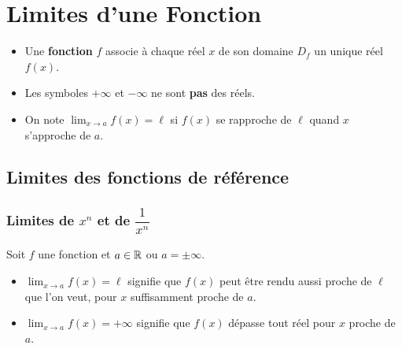 
\chapter{Limites d'une Fonction}

\begin{rappel}
  \begin{itemize}[leftmargin=1.2cm]
    \item Une \textbf{fonction} $f$ associe \`{a} chaque r\'{e}el $x$ de son domaine $D_f$
          un unique r\'{e}el $f(x)$.
    \item Les symboles $+\infty$ et $-\infty$ ne sont \textbf{pas} des r\'{e}els.
    \item On note $\displaystyle\lim_{x \to a} f(x) = \ell$ si $f(x)$
          se rapproche de $\ell$ quand $x$ s'approche de $a$.
  \end{itemize}
\end{rappel}

\section{Limites des fonctions de r\'{e}f\'{e}rence}

\subsection{Limites de \texorpdfstring{$x^n$}{x\^n} et de \texorpdfstring{$\dfrac{1}{x^n}$}{1/x\^n}}

\begin{definition}
  Soit $f$ une fonction et $a \in \mathbb{R}$ ou $a = \pm\infty$.
  \begin{itemize}
    \item $\displaystyle\lim_{x \to a} f(x) = \ell$ signifie que $f(x)$
          peut \^{e}tre rendu aussi proche de $\ell$ que l'on veut,
          pour $x$ suffisamment proche de $a$.
    \item $\displaystyle\lim_{x \to a} f(x) = +\infty$ signifie que $f(x)$
          d\'{e}passe tout r\'{e}el pour $x$ proche de $a$.
  \end{itemize}
\end{definition}

